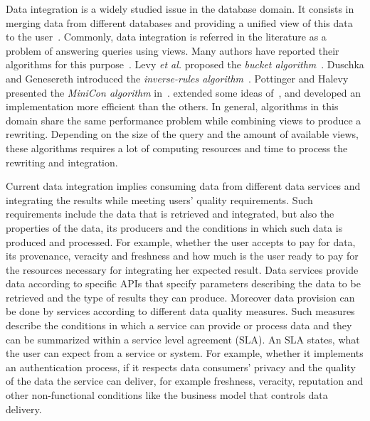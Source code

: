 \documentclass[11pt,a4paper,oneside]{report}
\begin{document}
Data integration is a widely studied issue in the database domain. It consists in merging data from different databases and providing a unified view of this data to the user~\cite{Lenzerini:2002}. Commonly, data integration is referred in the literature as a problem of answering queries using views. Many authors have reported their algorithms for this purpose~\cite{Halevy:2001}. Levy \textit{et al.} proposed the \textit{bucket algorithm}~\cite{Levy:1996}. %
Duschka and Genesereth introduced the \textit{inverse-rules algorithm}~\cite{Duschka:1997}. %
Pottinger and Halevy presented the \textit{MiniCon algorithm} in~\cite{Pottinger:2001}. \cite{Pottinger:2001} extended some ideas of~\cite{Duschka:1997}, and developed an implementation more efficient than the others. %
In general, algorithms in this domain share the same performance problem while combining views to produce a rewriting. Depending on the size of the query and the amount of available views, these algorithms requires a lot of computing resources and time to process the rewriting and integration. %

Current data integration implies consuming data from different data services and integrating the results while meeting users' quality requirements. Such requirements include the data that is retrieved and integrated, but also the properties of the data, its producers and the conditions in which such data is produced and processed. For example, whether the user accepts to pay for data, its provenance, veracity and freshness and how much is the user ready to pay for the resources necessary for integrating her expected result. Data services provide data according to specific APIs that specify parameters describing the data to be retrieved and the type of results they can produce. Moreover data provision can be done by services according to different data quality measures. Such measures describe the conditions in which a service can provide or process data and they can be summarized within a service level agreement (SLA). An SLA states, what the user can expect from a service or system. For example, whether it implements an authentication process, if it respects data consumers' privacy and the quality of the data the service can deliver, for example freshness, veracity, reputation and other non-functional conditions like the business model that controls data delivery. 
\end{document}

